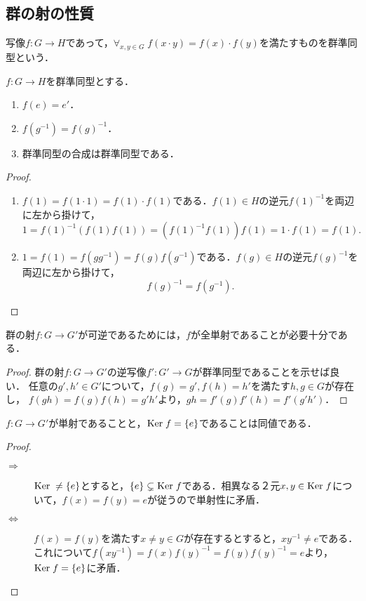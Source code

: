 \documentclass[uplatex,dvipdfmx]{jsreport}
\begin{document}
\subsection{群の射の性質}

\begin{definition}
    写像$f:G\to H$であって，$\forall_{x,y\in G}\;f(x\cdot y)=f(x)\cdot f(y)$を満たすものを群準同型という．
\end{definition}

\begin{proposition}[演算を保つなら単位元と逆元も保つ]
    $f:G\to H$を群準同型とする．
    \begin{enumerate}
        \item $f(e)=e'$．
        \item $f(g^{-1})=f(g)^{-1}$．
        \item 群準同型の合成は群準同型である．
    \end{enumerate}
\end{proposition}
\begin{proof}\mbox{}
    \begin{enumerate}
        \item $f(1)=f(1\cdot 1)=f(1)\cdot f(1)$である．$f(1)\in H$の逆元$f(1)^{-1}$を両辺に左から掛けて，\[1=f(1)^{-1}(f(1)f(1))=(f(1)^{-1}f(1))f(1)=1\cdot f(1)=f(1).\]
        \item $1=f(1)=f(gg^{-1})=f(g)f(g^{-1})$である．$f(g)\in H$の逆元$f(g)^{-1}$を両辺に左から掛けて，\[f(g)^{-1}=f(g^{-1}).\]
    \end{enumerate}
\end{proof}

\begin{proposition}\label{prop-Grp-is-balanced}
    群の射$f:G\to G'$が可逆であるためには，$f$が全単射であることが必要十分である．
\end{proposition}
\begin{proof}
    群の射$f:G\to G'$の逆写像$f':G'\to G$が群準同型であることを示せば良い．
    任意の$g',h'\in G'$について，$f(g)=g',f(h)=h'$を満たす$h,g\in G$が存在し，
    $f(gh)=f(g)f(h)=g'h'$より，$gh=f'(g)f'(h)=f'(g'h')$．
\end{proof}

\begin{proposition}[単射性の特徴付け]
    $f:G\to G'$が単射であることと，$\mathrm{Ker}\; f=\{e\}$であることは同値である．
\end{proposition}
\begin{proof}\mbox{}
    \begin{description}
        \item[$\Rightarrow$] $\mathrm{Ker}\;\ne\{e\}$とすると，$\{e\}\subsetneq\mathrm{Ker}\; f$である．相異なる２元$x,y\in\mathrm{Ker}\; f$について，$f(x)=f(y)=e$が従うので単射性に矛盾．
        \item[$\Leftrightarrow$] $f(x)=f(y)$を満たす$x\ne y\in G$が存在するとすると，$xy^{-1}\ne e$である．これについて$f(xy^{-1})=f(x)f(y)^{-1}=f(y)f(y)^{-1}=e$より，$\mathrm{Ker}\; f=\{e\}$に矛盾．
    \end{description}
\end{proof}
\end{document}
